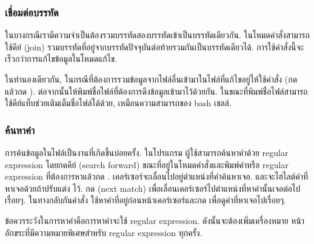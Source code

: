 \begin{thwbr}
\begin{figure}[!htb]
\end{figure}


\subsubsection{เชื่อมต่อบรรทัด}
ในบางกรณีเรามีความจำเป็นต้องรวมบรรทัดสองบรรทัดเข้าเป็นบรรทัดเดียวกัน. ในโหมดคำสั่งสามารถใช้คีย์  (join) รวมบรรทัดที่อยู่จากบรรทัดปัจจุบันต่อท้ายรวมกันเป็นบรรทัดเดียวได้. การใช้คำสั่งนี้จะเร็วกว่าการแก้ไขข้อมูลในโหมดแก้ไข.

ในทำนองเดียวกัน, ในกรณีที่ต้องการรวมข้อมูลจากไฟล์อื่นเข้ามาในไฟล์ที่แก้ไขอยู่ให้ใช้คำสั่ง  (กด \cmd{:} แล้วกด ). ต่อจากนั้นให้พิมพ์ชื่อไฟล์ที่ต้องการดึงข้อมูลเข้ามาไว้ด้วยกัน. ในขณะที่พิมพ์ชื่อไฟล์สามารถใช้คีย์แท็บช่วยเติมเต็มชื่อไฟล์ได้ด้วย, เหมือนความสามารถของ bash เชลล์. 


\begin{figure}[!htb]
\end{figure}



\subsubsection{ค้นหาคำ}
การค้นข้อมูลในไฟล์เป็นงานที่เกิดขึ้นบ่อยครั้ง. ในโปรแกรม  ผู้ใช้สามารถค้นหาคำด้วย regular expression โดยกดคีย์ \cmd{/} (search forward) ขณะที่อยู่ในโหมดคำสั่งและพิมพ์คำหรือ regular expression ที่ต้องการหาแล้วกด . เคอร์เซอร์จะเลื่อนไปอยู่ตำแหน่งที่คำค้นหาเจอ. และจะไฮไลต์คำที่หาเจอด้วยถ้าปรับแต่ง  ไว้. กด  (next match) เพื่อเลื่อนเคอร์เซอร์ไปตำแหน่งที่หาคำนั้นเจอต่อไปเรื่อยๆ. ในทางกลับกันคำสั่ง  ใช้หาคำที่อยู่ก่อนหน้าเคอร์เซอร์และกด  เพื่อดูคำที่หาเจอไปเรื่อยๆ.

\begin{figure}[!htb]
\end{figure}

ข้อควรระวังในการหาคำคือการหาคำจะใช้ regular expression. ดังนั้นจะต้องเพิ่มเครื่องหมาย \cmd{\bs} หน้าอักขระที่มีความหมายพิเศษสำหรับ regular expression ทุกครั้ง.



\end{thwbr}
